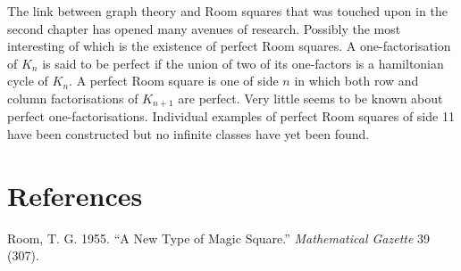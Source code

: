 \documentclass[
  12pt,
  a4paper]{book}
\begin{document}
The link between graph theory and Room squares that was touched upon in
the second chapter has opened many avenues of research. Possibly the
most interesting of which is the existence of perfect Room squares. A
one-factorisation of \(K_n\) is said to be perfect if the union of two
of its one-factors is a hamiltonian cycle of \(K_n\). A perfect Room
square is one of side \(n\) in which both row and column factorisations
of \(K_{n+1}\) are perfect. Very little seems to be known about perfect
one-factorisations. Individual examples of perfect Room squares of side
11 have been constructed but no infinite classes have yet been found.

\hypertarget{references}{%
\chapter*{References}\label{references}}

\hypertarget{refs}{}
\leavevmode\hypertarget{ref-room_new_1955}{}%
Room, T. G. 1955. ``A New Type of Magic Square.'' \emph{Mathematical
Gazette} 39 (307).

\backmatter
\end{document}

